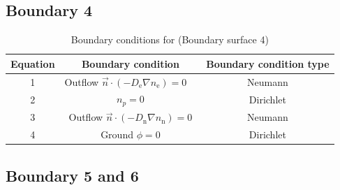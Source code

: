 \documentclass[12pt, a4paper]{report}
\begin{document}
\subsection{Boundary 4}

\begin{table}[!h]
    \centering\begin{tabular}{c|c|c}
        Equation & Boundary condition & Boundary condition type\\ \hline
        1 & Outflow $\vec{n} \cdot\left(-D_{\mathrm{e}} \nabla n_{\mathrm{e}}\right)=0\quad$ & Neumann \\ \hline
        2 & $n_p=0$  & Dirichlet \\ \hline
        3 & Outflow $\vec{n} \cdot\left(-D_{\mathrm{n}} \nabla n_{\mathrm{n}}\right)=0$ &Neumann \\ \hline
        4 & Ground $\phi=0$ & Dirichlet \\ \hline

    \end{tabular}
    \caption{Boundary conditions for  (Boundary surface 4)}
\end{table}
\clearpage

\subsection{Boundary 5 and 6}
\end{document}
